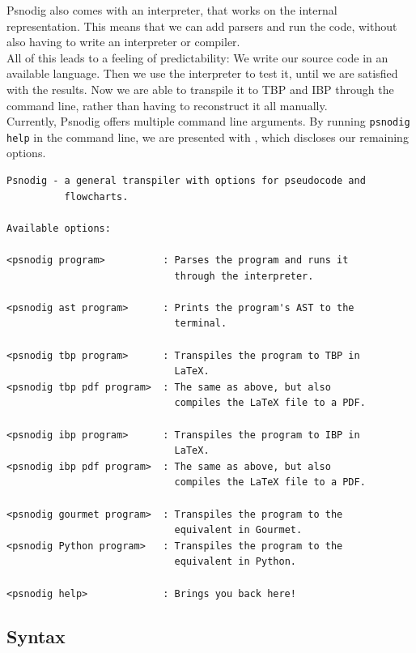 Psnodig also comes with an interpreter, that works on the internal representation. This means that we can add parsers and run the code, without also having to write an interpreter or compiler. \\

All of this leads to a feeling of predictability: We write our source code in an available language. Then we use the interpreter to test it, until we are satisfied with the results. Now we are able to transpile it to TBP and IBP through the command line, rather than having to reconstruct it all manually. \\

Currently, Psnodig offers multiple command line arguments. By running \texttt{psnodig help} in the command line, we are presented with , which discloses our remaining options. \\

\begin{lstlisting}[caption={The command line options for Psnodig, presented by running \texttt{psnodig help} in the terminal.}, captionpos=b, label={psnodigCMDoptions}]
Psnodig - a general transpiler with options for pseudocode and
          flowcharts.

Available options:

<psnodig program>          : Parses the program and runs it
                             through the interpreter.

<psnodig ast program>      : Prints the program's AST to the
                             terminal.

<psnodig tbp program>      : Transpiles the program to TBP in
                             LaTeX.
<psnodig tbp pdf program>  : The same as above, but also
                             compiles the LaTeX file to a PDF.

<psnodig ibp program>      : Transpiles the program to IBP in
                             LaTeX.
<psnodig ibp pdf program>  : The same as above, but also
                             compiles the LaTeX file to a PDF.

<psnodig gourmet program>  : Transpiles the program to the
                             equivalent in Gourmet.
<psnodig Python program>   : Transpiles the program to the
                             equivalent in Python.

<psnodig help>             : Brings you back here!
\end{lstlisting}

\subsection{Syntax}

